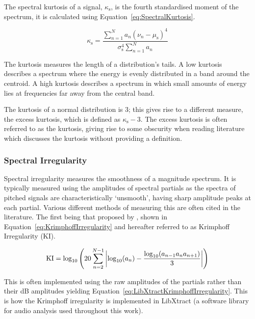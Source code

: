 			The spectral kurtosis of a signal, $\kappa_{\mathrm{s}}$, is the fourth standardised moment of the
			spectrum, it is calculated using Equation~\ref{eq:SpectralKurtosis}.

			\begin{equation}
				\kappa_{\mathrm{s}} = \frac{\sum_{n = 1}^{N} a_{n}(\nu_{n} - \mu_{\mathrm{s}})^{4}}
					{\sigma_{\mathrm{s}}^{4}\sum_{n = 1}^{N} a_{n}}
				\label{eq:SpectralKurtosis}
			\end{equation}

			The kurtosis measures the length of a distribution's tails. A low kurtosis describes a spectrum
			where the energy is evenly distributed in a band around the centroid. A high kurtosis describes a
			spectrum in which small amounts of energy lies at frequencies far away from the central band.

			The kurtosis of a normal distribution is 3; this gives rise to a different measure, the excess
			kurtosis, which is defined as $\kappa_{\mathrm{s}} - 3$. The excess kurtosis is often referred to
			as the kurtosis, giving rise to some obscurity when reading literature which discusses the kurtosis
			without providing a definition.

		\subsubsection*{Spectral Irregularity}
			Spectral irregularity measures the smoothness of a magnitude spectrum. It is typically measured
			using the amplitudes of spectral partials as the spectra of pitched signals are characteristically
			`unsmooth', having sharp amplitude peaks at each partial. Various different methods of measuring
			this are often cited in the literature. The first being that proposed by
			\citet{krimphoff1994caracterisation}, shown in Equation~\ref{eq:KrimphoffIrregularity} and
			hereafter referred to as Krimphoff Irregularity ($\mathrm{KI}$).

			\begin{equation}
				\mathrm{KI} = \log_{10} \left( 20 \sum_{n = 2}^{N - 1}
						   \left|\log_{10}(a_{n}) - \frac{\log_{10}(a_{n-1}a_{n}a_{n+1})}{3}\right|
						   \right)
				\label{eq:KrimphoffIrregularity}
			\end{equation}

			This is often implemented using the raw amplitudes of the partials rather than their dB amplitudes
			yielding Equation~\ref{eq:LibXtractKrimphoffIrregularity}. This is how the Krimphoff irregularity
			is implemented in LibXtract \citep{bullock2007libxtract} (a software library for audio analysis
			used throughout this work).


